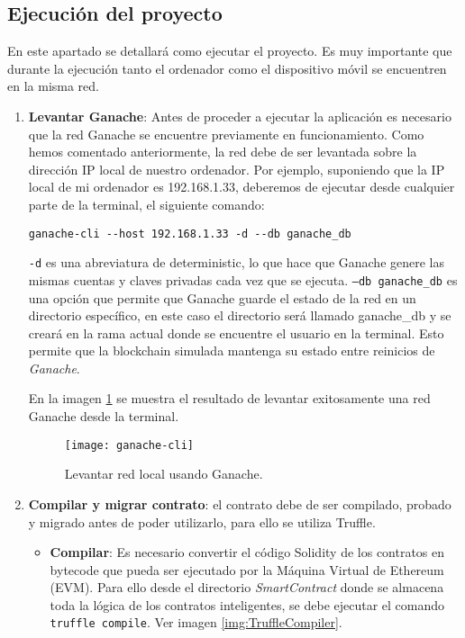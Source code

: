\subsection{Ejecución del proyecto}

En este apartado se detallará como ejecutar el proyecto. Es muy importante que durante la ejecución tanto el ordenador como el dispositivo móvil se encuentren en la misma red.

\begin{enumerate}

\item \textbf{Levantar Ganache}: Antes de proceder a ejecutar la aplicación es necesario que la red Ganache se encuentre previamente en funcionamiento.
Como hemos comentado anteriormente, la red debe de ser levantada sobre la dirección IP local de nuestro ordenador. Por ejemplo, suponiendo que la IP local de mi ordenador es 192.168.1.33, deberemos de ejecutar desde cualquier parte de la terminal, el siguiente comando: 
\begin{verbatim}
ganache-cli --host 192.168.1.33 -d --db ganache_db
\end{verbatim}

\texttt{-d} es una abreviatura de deterministic, lo que hace que Ganache genere las mismas cuentas y claves privadas cada vez que se ejecuta.
\texttt{--db ganache\_db} es una opción que permite que Ganache guarde el estado de la red en un directorio específico, en este caso el directorio será llamado ganache\_db y se creará en la rama actual donde se encuentre el usuario en la terminal.
Esto permite que la blockchain simulada mantenga su estado entre reinicios de \textit{Ganache}.

En la imagen \ref{img:ganache-cli} se muestra el resultado de levantar exitosamente una red Ganache desde la terminal.

\begin{figure}[h]
	\label{img:ganache-cli}
	\centering
	\texttt{[image: ganache-cli]}
	\caption[Levantar red Ganache]{Levantar red local usando Ganache.}
\end{figure}

\item \textbf{Compilar y migrar contrato}: el contrato debe de ser compilado, probado y migrado antes de poder utilizarlo, para ello se utiliza Truffle.

	\begin{itemize}
	\item \textbf{Compilar}: Es necesario convertir el código
	Solidity de los contratos en bytecode que pueda
	ser ejecutado por la Máquina Virtual de Ethereum (EVM).
	Para ello desde el directorio \textit{SmartContract} donde se
	almacena toda la lógica de los contratos
	inteligentes, se debe ejecutar el comando \texttt{truffle
	compile}.
	Ver imagen \ref{img:TruffleCompiler}.
	\end{itemize}
	

\end{enumerate}
